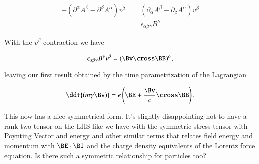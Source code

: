 \begin{align*}
-\left( \partial^\alpha A^\beta - \partial^\beta A^\alpha \right) v^\beta 
&=
\left( \partial_\alpha A^\beta - \partial_\beta A^\alpha \right) v^\beta \\
&=
\epsilon_{\alpha \beta \gamma} B^\gamma
\end{align*}

With the $v^\beta$ contraction we have

\begin{equation}\label{eqn:lorentzForceHamiltonian:370}
\epsilon_{\alpha \beta \gamma} B^\gamma v^\beta 
= (\Bv \cross \BB)^\alpha,
\end{equation}

leaving our first result obtained by the time parametrization of the Lagrangian

\begin{equation}\label{eqn:lorentzForceHamiltonian:380}
\ddt{(m \gamma \Bv)} = e \left(\BE + \frac{\Bv}{c} \cross \BB \right).
\end{equation}

This now has a nice symmetrical form.  It's slightly disappointing not to have a rank two tensor on the LHS like we have with the symmetric stress tensor with Poynting Vector and energy and other similar terms that relates field energy and momentum with $\BE \cdot \BJ$ and the charge density equivalents of the Lorentz force equation.  Is there such a symmetric relationship for particles too?

\EndArticle
